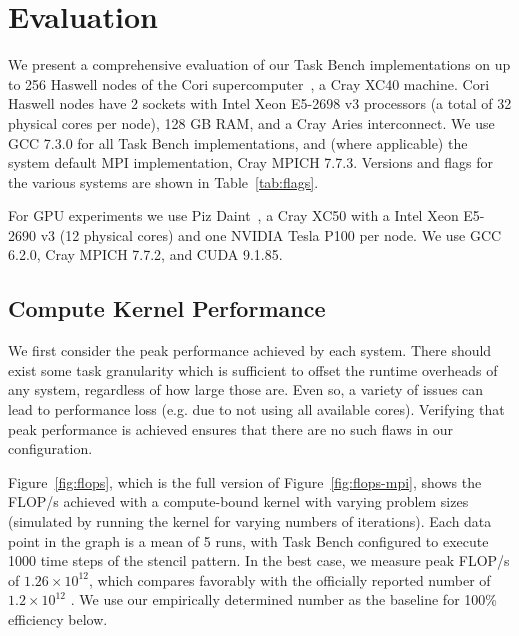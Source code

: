 \section{Evaluation}
\label{sec:evaluation}

We present a comprehensive evaluation of our Task Bench implementations on up to 256
Haswell nodes of the Cori supercomputer~\cite{Cori}, a Cray XC40
machine. Cori Haswell nodes have 2 sockets with Intel Xeon E5-2698 v3
processors (a total of 32 physical cores per node), 128 GB RAM, and a
Cray Aries interconnect. We use GCC 7.3.0 for all Task Bench
implementations, and (where applicable) the system default MPI
implementation, Cray MPICH 7.7.3. Versions and flags for the
various systems are shown in Table~\ref{tab:flags}.







For GPU experiments we use Piz Daint~\cite{PizDaint}, a Cray XC50 with
a Intel Xeon E5-2690 v3 (12 physical cores) and one NVIDIA Tesla
P100 per node. We use GCC 6.2.0, Cray MPICH 7.7.2, and
CUDA 9.1.85.

\subsection{Compute Kernel Performance}
\label{subsec:peak-performance-and-efficiency}

{\color{blue}

We first consider the peak performance achieved by each system. There
should exist some task granularity which is sufficient to offset the
runtime overheads of any system, regardless of how large those
are. Even so, a variety of issues can lead to performance loss
(e.g. due to not using all available cores). Verifying that peak
performance is achieved ensures that there are no such flaws in our
configuration.

}

Figure~\ref{fig:flops}, which is the full version of
Figure~\ref{fig:flops-mpi}, shows the FLOP/s achieved with a compute-bound
kernel with varying problem sizes (simulated by running the kernel for varying numbers of iterations). Each data point in the graph is a mean of 5 runs, with Task Bench configured to execute 1000 time steps of the stencil pattern. In the best case, we measure peak FLOP/s of
$1.26 \times 10^{12}$, which compares favorably with the officially
reported number of $1.2 \times 10^{12}$ \cite{Cori}. We use our empirically determined number as
the baseline for 100\% efficiency below.

